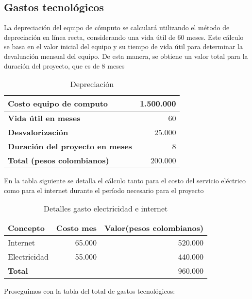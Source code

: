\subsection{Gastos tecnológicos}
La depreciación del equipo de cómputo se calculará utilizando el método de depreciación en línea recta, considerando una vida útil de 60 meses. Este cálculo se basa en el valor inicial del equipo y su tiempo de vida útil para determinar la devaluación mensual del equipo. De esta manera, se obtiene un valor total para la duración del proyecto, que es de 8 meses


\begin{table}[h]
    \centering

    \begin{tabular}{|l|r|}
        \hline
        \textbf{Costo equipo de computo} & 1.500.000 \\
        \hline
        \textbf{Vida útil en meses} & 60 \\
        \hline
        \textbf{Desvalorización} & 25.000 \\
        \hline
        \textbf{Duración del proyecto en meses} & 8 \\
        \hline
        \textbf{Total (pesos colombianos)} & 200.000 \\
        \hline
    \end{tabular}
    \caption{Depreciación}
\end{table}

En la tabla siguiente se detalla el cálculo tanto para el costo del servicio eléctrico como para el internet durante el período necesario para el proyecto

\begin{table}[h]
    \centering
    \label{tab:detalles-proyecto}
    \begin{tabular}{|l|r|r|}
        \hline
        \textbf{Concepto} & \textbf{Costo mes} & \textbf{Valor(pesos colombianos)} \\
        \hline
        Internet & 65.000 & 520.000 \\
        Electricidad & 55.000 & 440.000 \\
        \hline
        \textbf{Total} & & 960.000 \\
        \hline
    \end{tabular}
    \caption{Detalles gasto electricidad e internet}
\end{table}

Proseguimos con la tabla del total de gastos tecnológicos:

